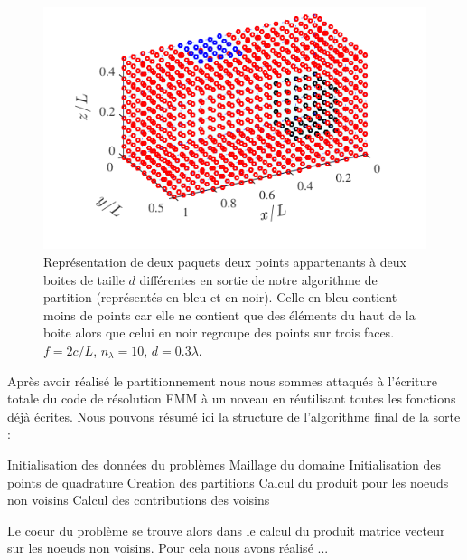 \documentclass[10pt]{article}
\begin{document}
\begin{multicols}{2}
\begin{figure}[H]
  \begin{center}
  \includegraphics[width=0.95\columnwidth]{Q6.pdf}
  \vspace*{-11pt}
  \caption{Représentation de deux paquets deux points appartenants à deux boites de taille $d$ différentes en sortie de notre algorithme de partition (représentés en bleu et en noir). Celle en bleu contient moins de points car elle ne contient que des éléments du haut de la boite alors que celui en noir regroupe des points sur trois faces. $f=2c/L$, $n_\lambda = 10$, $d=0.3\lambda$.}
  \label{fig:Q6}
  \end{center}
\end{figure}

Après avoir réalisé le partitionnement nous nous sommes attaqués à l'écriture totale du code de résolution FMM à un noveau en réutilisant toutes les fonctions déjà écrites. Nous pouvons résumé ici la structure de l'algorithme final de la sorte : 

\begin{algorithm}[H]
	\begin{algorithmic}[1]
		\State Initialisation des données du problèmes
        \State Maillage du domaine
        \State Initialisation des points de quadrature
        \State Creation des partitions
        \State Calcul du produit pour les noeuds non voisins
        \State Calcul des contributions des voisins
	\end{algorithmic}
\end{algorithm}
    
Le coeur du problème se trouve alors dans le calcul du produit matrice vecteur sur les noeuds non voisins. Pour cela nous avons réalisé ...


\vspace*{22pt}


\end{multicols}
\end{document}
